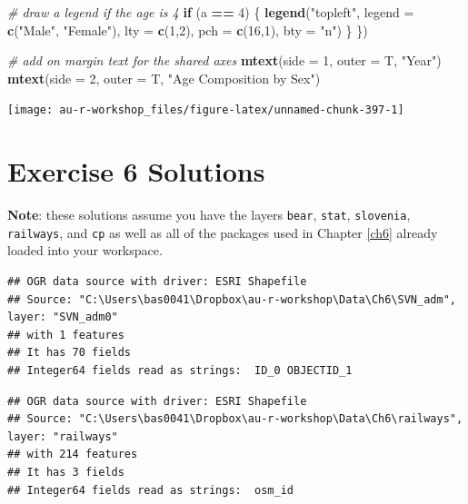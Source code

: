 \documentclass[]{book}
\newenvironment{Shaded}{\begin{snugshade}}{\end{snugshade}}
\newcommand{\KeywordTok}[1]{\textcolor[rgb]{0.13,0.29,0.53}{\textbf{#1}}}
\newcommand{\DataTypeTok}[1]{\textcolor[rgb]{0.13,0.29,0.53}{#1}}
\newcommand{\DecValTok}[1]{\textcolor[rgb]{0.00,0.00,0.81}{#1}}
\newcommand{\StringTok}[1]{\textcolor[rgb]{0.31,0.60,0.02}{#1}}
\newcommand{\CommentTok}[1]{\textcolor[rgb]{0.56,0.35,0.01}{\textit{#1}}}
\newcommand{\ControlFlowTok}[1]{\textcolor[rgb]{0.13,0.29,0.53}{\textbf{#1}}}
\newcommand{\OperatorTok}[1]{\textcolor[rgb]{0.81,0.36,0.00}{\textbf{#1}}}
\newcommand{\NormalTok}[1]{#1}
\theoremstyle{definition}
\theoremstyle{definition}
\theoremstyle{definition}
\theoremstyle{remark}
\begin{document}
\begin{Shaded}
\begin{Highlighting}[]
  \CommentTok{# draw a legend if the age is 4}
  \ControlFlowTok{if}\NormalTok{ (a }\OperatorTok{==}\StringTok{ }\DecValTok{4}\NormalTok{) \{}
    \KeywordTok{legend}\NormalTok{(}\StringTok{"topleft"}\NormalTok{, }\DataTypeTok{legend =} \KeywordTok{c}\NormalTok{(}\StringTok{"Male"}\NormalTok{, }\StringTok{"Female"}\NormalTok{),}
           \DataTypeTok{lty =} \KeywordTok{c}\NormalTok{(}\DecValTok{1}\NormalTok{,}\DecValTok{2}\NormalTok{), }\DataTypeTok{pch =} \KeywordTok{c}\NormalTok{(}\DecValTok{16}\NormalTok{,}\DecValTok{1}\NormalTok{), }\DataTypeTok{bty =} \StringTok{"n"}\NormalTok{)}
\NormalTok{  \}}
\NormalTok{\})}

\CommentTok{# add on margin text for the shared axes}
\KeywordTok{mtext}\NormalTok{(}\DataTypeTok{side =} \DecValTok{1}\NormalTok{, }\DataTypeTok{outer =}\NormalTok{ T, }\StringTok{"Year"}\NormalTok{)}
\KeywordTok{mtext}\NormalTok{(}\DataTypeTok{side =} \DecValTok{2}\NormalTok{, }\DataTypeTok{outer =}\NormalTok{ T, }\StringTok{"Age Composition by Sex"}\NormalTok{)}
\end{Highlighting}
\end{Shaded}

\begin{center}\texttt{[image: au-r-workshop\_files/figure-latex/unnamed-chunk-397-1]} \end{center}

\section*{Exercise 6 Solutions}\label{ex6-answers}

\textbf{Note}: these solutions assume you have the layers \texttt{bear},
\texttt{stat}, \texttt{slovenia}, \texttt{railways}, and \texttt{cp} as
well as all of the packages used in Chapter \ref{ch6} already loaded
into your workspace.

\begin{verbatim}
## OGR data source with driver: ESRI Shapefile 
## Source: "C:\Users\bas0041\Dropbox\au-r-workshop\Data\Ch6\SVN_adm", layer: "SVN_adm0"
## with 1 features
## It has 70 fields
## Integer64 fields read as strings:  ID_0 OBJECTID_1
\end{verbatim}

\begin{verbatim}
## OGR data source with driver: ESRI Shapefile 
## Source: "C:\Users\bas0041\Dropbox\au-r-workshop\Data\Ch6\railways", layer: "railways"
## with 214 features
## It has 3 fields
## Integer64 fields read as strings:  osm_id
\end{verbatim}
\end{document}
